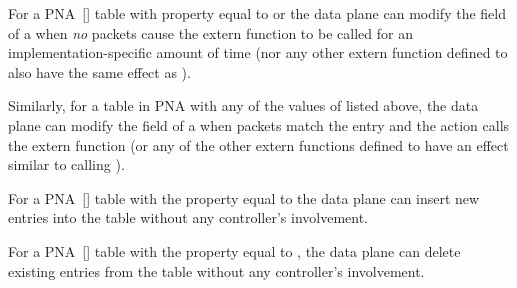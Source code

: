 \documentclass[11pt]{article}
\begin{document}
{%
For a PNA~[] table with property  equal to
 or 
the data plane can modify the  field of a 
when \emph{no} packets cause the extern function  to
be called for an implementation-specific amount of time (nor any other
extern function defined to also have the same effect as
).%

Similarly, for a table in PNA with any of the values of
 listed above, the data plane can modify the
 field of a  when packets match the entry
and the action calls the  extern function (or any
of the other extern functions defined to have an effect similar to
calling ).%

For a PNA~[] table with the property  equal to 
the data plane can insert new entries into the table without any
controller's involvement.%

For a PNA~[] table with the property  equal to
, the data plane can delete existing
entries from the table without any controller's involvement.%

}
\end{document}
